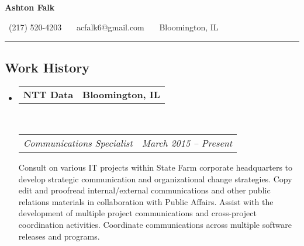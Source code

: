 \documentclass[10pt,letterpaper]{article}
\makeatletter
\newcommand{\headerrow}[2]
{\begin{tabular*}{\linewidth}{l@{\extracolsep{\fill}}r}
	#1 &
	#2 \\
\end{tabular*}}
\makeatother
\begin{document}
\begin{center}
{\LARGE \textbf{Ashton Falk}}

\ (217) 520-4203 \ \textbullet \ \ acfalk6@gmail.com \ \textbullet \ \ Bloomington, IL
\end{center}

\hrule
\vspace{-0.4em}
\subsection*{Work History}

\begin{itemize}
	\parskip=0.1em

	\item
	\headerrow
		{\textbf{NTT Data}}
		{\textbf{Bloomington, IL}}
	\\
	\headerrow
		{\emph{Communications Specialist}}
		{\emph{March 2015 -- Present}}
        Consult on various IT projects within State Farm corporate headquarters to develop strategic communication and
        organizational change strategies. Copy edit and proofread internal/external communications and other public
        relations materials in collaboration with Public Affairs. Assist with the development of multiple project 
        communications and cross-project coordination activities. Coordinate communications across multiple software
        releases and programs.


\end{itemize}
\end{document}
